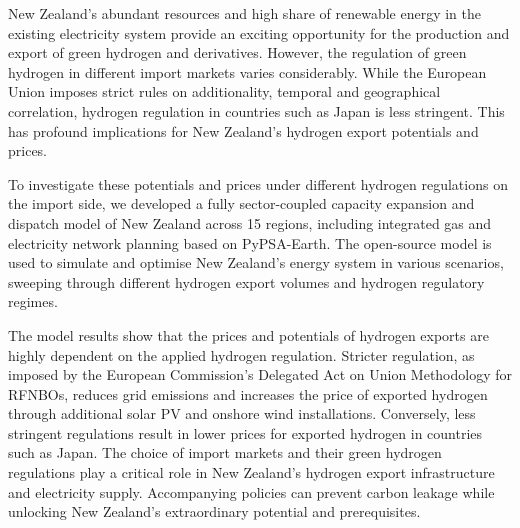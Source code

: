 New Zealand's abundant resources and high share of renewable energy in the existing electricity system provide an exciting opportunity for the production and export of green hydrogen and derivatives. However, the regulation of green hydrogen in different import markets varies considerably. While the European Union imposes strict rules on additionality, temporal and geographical correlation, hydrogen regulation in countries such as Japan is less stringent. This has profound implications for New Zealand's hydrogen export potentials and prices.

To investigate these potentials and prices under different hydrogen regulations on the import side, we developed a fully sector-coupled capacity expansion and dispatch model of New Zealand across 15 regions, including integrated gas and electricity network planning based on PyPSA-Earth. The open-source model is used to simulate and optimise New Zealand's energy system in various scenarios, sweeping through different hydrogen export volumes and hydrogen regulatory regimes.

The model results show that the prices and potentials of hydrogen exports are highly dependent on the applied hydrogen regulation. Stricter regulation, as imposed by the European Commission's Delegated Act on Union Methodology for RFNBOs, reduces grid emissions and increases the price of exported hydrogen through additional solar PV and onshore wind installations. Conversely, less stringent regulations result in lower prices for exported hydrogen in countries such as Japan. The choice of import markets and their green hydrogen regulations play a critical role in New Zealand's hydrogen export infrastructure and electricity supply. Accompanying policies can prevent carbon leakage while unlocking New Zealand's extraordinary potential and prerequisites.